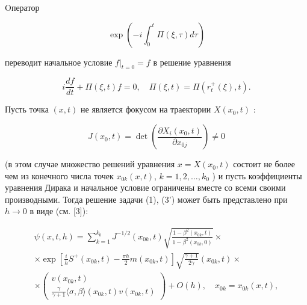\documentclass[10pt]{article}
\begin{document}
Oператор



\[

\exp \left(-i \int_{0}^{t} \Pi(\xi, \tau) d \tau\right)

\]



переводит начальное условие $\left.f\right|_{t=0}=f$ в решение уравнения



\[

i \frac{d f}{d t}+\Pi(\xi, t) f=0, \quad \Pi(\xi, t)=\Pi\left(r_{t}^{+}(\xi), t\right) .

\]



Пусть точка $(x, t)$ не является фокусом на траектории $X\left(x_{0}, t\right)$ :



\[

J\left(x_{0}, t\right)=\operatorname{det}\left(\frac{\partial X_{i}\left(x_{0}, t\right)}{\partial x_{0 j}}\right) \neq 0

\]



(в этом случае множество решений уравнения $x=X\left(x_{0}, t\right)$ состоит не более чем из конечного числа точек $x_{0 k}(x, t)$, $k=1,2, \ldots, k_{0}$ ) и пусть коэффициенты уравнения Дирака и начальное условие ограничены вместе со всеми своими производными. Тогда решение задачи (1), (3') может быть представлено при $h \rightarrow 0$ в виде (см. [3]):



\[

\begin{gathered}

\psi(x, t, h)=\sum_{k=1}^{k_{0}} J^{-1 / 2}\left(x_{0 k}, t\right) \sqrt{\frac{1-\beta^{2}\left(x_{0 k}, t\right)}{1-\beta^{2}\left(x_{0 k}, 0\right)}} \times \\

\times \exp \left[\frac{i}{h} S^{+}\left(x_{0 k}, t\right)-\frac{\pi h}{2} m\left(x_{0 k}, t\right)\right] \sqrt{\frac{\gamma+1}{2 \gamma}}\left(x_{0 k}, t\right) \times \\

\times\left(\begin{array}{c}

v\left(x_{0 k}, t\right) \\

\frac{\gamma}{\gamma+1}\langle\sigma, \beta\rangle\left(x_{0 k}, t\right) v\left(x_{0 k}, t\right)

\end{array}\right)+O(h), \quad x_{0 k}=x_{0 k}(x, t),

\end{gathered}

\]
\end{document}
